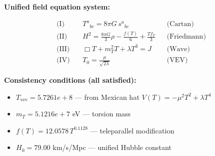 
\textbf{Unified field equation system:}

\begin{align}
  \text{(I)} \quad & T^a{}_{bc} = 8\pi G \, s^a{}_{bc} && \text{(Cartan)} \\
  \text{(II)} \quad & H^2 = \frac{8\pi G}{3}\rho - \frac{f(T)}{6} + \frac{Tf_T}{3} && \text{(Friedmann)} \\
  \text{(III)} \quad & \Box T + m_T^2 T + \lambda T^3 = J && \text{(Wave)} \\
  \text{(IV)} \quad & T_0 = \frac{\mu}{\sqrt{2\lambda}} && \text{(VEV)}
\end{align}

\textbf{Consistency conditions (all satisfied):}
\begin{itemize}
  \item $T_{\text{vev}} = 5.7261e+8$ — from Mexican hat $V(T) = -\mu^2 T^2 + \lambda T^4$
  \item $m_T = 5.1216e+7$ eV — torsion mass
  \item $f(T) = 12.0578 \, T^{0.1128}$ — teleparallel modification
  \item $H_0 = 79.00$ km/s/Mpc — unified Hubble constant
\end{itemize}